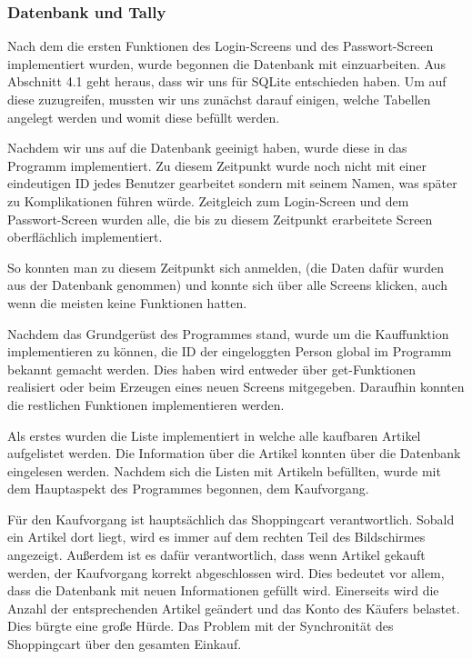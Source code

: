 \documentclass[11pt,a4paper]{article} %
\begin{document}
\subsubsection{Datenbank und Tally}
Nach dem die ersten Funktionen des Login-Screens und des Passwort-Screen implementiert wurden, wurde begonnen die Datenbank mit einzuarbeiten.
Aus Abschnitt 4.1 geht heraus, dass wir uns für SQLite entschieden haben. Um auf diese zuzugreifen, mussten wir uns zunächst darauf einigen, welche Tabellen angelegt werden und womit diese befüllt werden.
\par
Nachdem wir uns auf die Datenbank geeinigt haben, wurde diese in das Programm implementiert.
Zu diesem Zeitpunkt wurde noch nicht mit einer eindeutigen ID jedes Benutzer gearbeitet sondern mit seinem Namen, was später zu Komplikationen führen würde.
Zeitgleich zum Login-Screen und dem Passwort-Screen wurden alle, die bis zu diesem Zeitpunkt erarbeitete Screen oberflächlich implementiert.
\par
So konnten man zu diesem Zeitpunkt sich anmelden, (die Daten dafür wurden aus der Datenbank genommen) und konnte sich über alle Screens klicken, auch wenn die meisten keine Funktionen hatten.
\par
Nachdem das Grundgerüst des Programmes stand, wurde um die Kauffunktion implementieren zu können, die ID der eingeloggten Person global im Programm bekannt gemacht werden.
Dies haben wird entweder über get-Funktionen realisiert oder beim Erzeugen eines neuen Screens mitgegeben.
Daraufhin konnten die restlichen Funktionen implementieren werden.
\par
Als erstes wurden die Liste implementiert in welche alle kaufbaren Artikel aufgelistet werden.
Die Information über die Artikel konnten über die Datenbank eingelesen werden.
Nachdem sich die Listen mit Artikeln befüllten, wurde mit dem Hauptaspekt des Programmes begonnen, dem Kaufvorgang.
\par
Für den Kaufvorgang ist hauptsächlich das Shoppingcart verantwortlich. Sobald ein Artikel dort liegt, wird es immer auf dem rechten Teil des Bildschirmes angezeigt.
Außerdem ist es dafür verantwortlich, dass wenn Artikel gekauft werden, der Kaufvorgang korrekt abgeschlossen wird.
Dies bedeutet vor allem, dass die Datenbank mit neuen Informationen gefüllt wird. Einerseits wird die Anzahl der entsprechenden Artikel geändert und das Konto des Käufers belastet.
Dies bürgte eine große Hürde. Das Problem mit der Synchronität des Shoppingcart über den gesamten Einkauf.
\par
\end{document}
